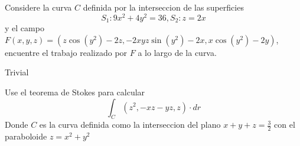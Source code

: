 \documentclass[../main.tex]{subfiles}
\begin{document}
\begin{problem}
  Considere la curva $C$ definida por la interseccion de las superficies
  \begin{equation*}
    S_{1}: 9x^{2} + 4y^{2} = 36, S_{2} : z = 2x
  \end{equation*}
  y el campo $F(x, y, z) = (z \cos(y^{2}) - 2z, -2xyz \sin(y^{2}) - 2x, x \cos(y^{2}) -2y)$, encuentre el trabajo realizado por $F$ a lo largo de la curva.
\end{problem}
\begin{solution}
Trivial
\end{solution}

\begin{problem}
  Use el teorema de Stokes para calcular
  \begin{equation*}
    \int_{C} (z^{2}, -xz - yz, z) \cdot dr
  \end{equation*}
  Donde $C$ es la curva definida como la interseccion del plano $x + y + z = \frac32$ con el paraboloide $z = x^{2} + y^{2}$
\end{problem}
\end{document}
